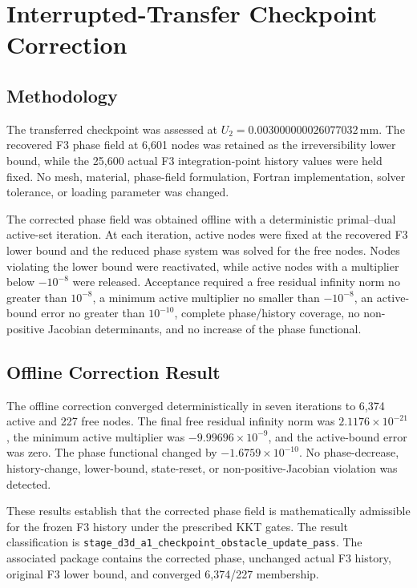 \chapter{Interrupted-Transfer Checkpoint Correction}
\label{chap:d3d-a1-checkpoint}

\section{Methodology}

The transferred checkpoint was assessed at
\(U_2=0.003000000026077032\,\mathrm{mm}\).  The recovered F3 phase field at
6,601 nodes was retained as the irreversibility lower bound, while the 25,600
actual F3 integration-point history values were held fixed.  No mesh,
material, phase-field formulation, Fortran implementation, solver tolerance,
or loading parameter was changed.

The corrected phase field was obtained offline with a deterministic
primal--dual active-set iteration.  At each iteration, active nodes were fixed
at the recovered F3 lower bound and the reduced phase system was solved for the
free nodes.  Nodes violating the lower bound were reactivated, while active
nodes with a multiplier below \(-10^{-8}\) were released.  Acceptance required
a free residual infinity norm no greater than \(10^{-8}\), a minimum active
multiplier no smaller than \(-10^{-8}\), an active-bound error no greater than
\(10^{-10}\), complete phase/history coverage, no non-positive Jacobian
determinants, and no increase of the phase functional.

\section{Offline Correction Result}

The offline correction converged deterministically in seven iterations to
6,374 active and 227 free nodes.  The final free residual infinity norm was
\(2.1176\times10^{-21}\), the minimum active multiplier was
\(-9.99696\times10^{-9}\), and the active-bound error was zero.  The phase
functional changed by \(-1.6759\times10^{-10}\).  No phase-decrease,
history-change, lower-bound, state-reset, or non-positive-Jacobian violation
was detected.

These results establish that the corrected phase field is mathematically
admissible for the frozen F3 history under the prescribed KKT gates.  The
result classification is
\texttt{stage\_d3d\_a1\_checkpoint\_obstacle\_update\_pass}.  The associated
package contains the corrected phase, unchanged actual F3 history, original F3
lower bound, and converged 6,374/227 membership.

